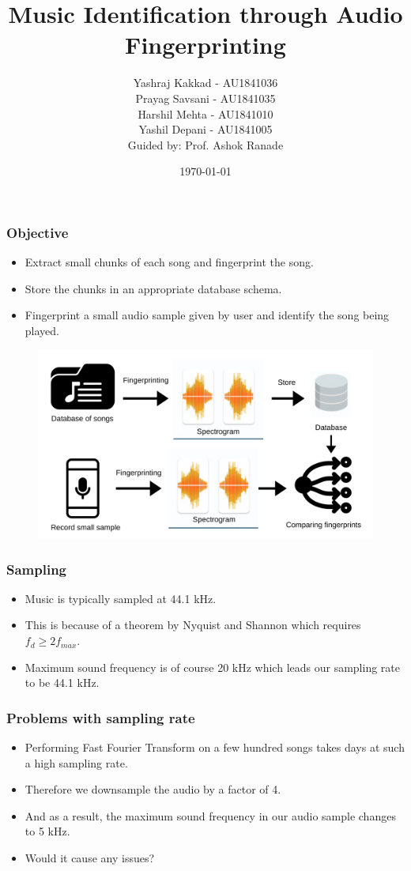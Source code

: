 \documentclass{beamer}
\author{Yashraj Kakkad - AU1841036 \\
        Prayag Savsani - AU1841035 \\
        Harshil Mehta - AU1841010 \\
        Yashil Depani - AU1841005 \\
        \vspace{8pt}Guided by: Prof. Ashok Ranade}
\title{Music Identification through Audio Fingerprinting}
\institute{Ahmedabad University}
\date{\today}
\begin{document}
\maketitle

\begin{frame}[t] %
\frametitle{Objective}
\begin{itemize}
    \item Extract small chunks of each song and fingerprint the song.
    \item Store the chunks in an appropriate database schema. 
    \item Fingerprint a small audio sample given by user and identify the song being played.
\end{itemize}
\begin{figure}
    \includegraphics[width=\textwidth]{Flowchart.png}
\end{figure}
\end{frame}

\begin{frame}
\frametitle{Sampling}
\begin{itemize}
    \item Music is typically sampled at \alert{44.1 kHz}.
    \item This is because of a theorem by \alert{Nyquist and Shannon} which requires \(f_{d} \ge 2f_{max}\).
    \item Maximum sound frequency is of course 20 kHz which leads our sampling rate to be 44.1 kHz.
\end{itemize}        
\end{frame}


\begin{frame}
    \frametitle{Problems with sampling rate}
    \begin{itemize}
        \item Performing \alert{Fast Fourier Transform} on a few hundred songs takes days at such a high sampling rate.
        \item Therefore we downsample the audio by \alert{a factor of 4}. 
        \item And as a result, the maximum sound frequency in our audio sample changes to \alert{5 kHz}. 
        \item Would it cause any issues?
    \end{itemize}
\end{frame}
\end{document}
